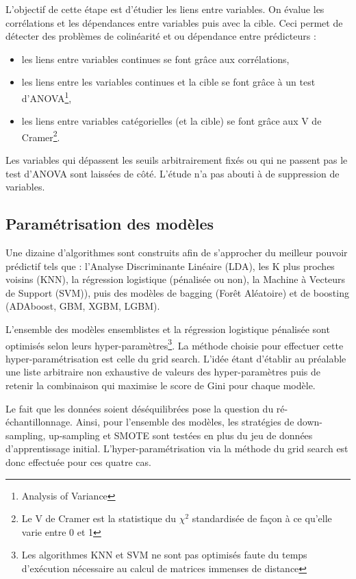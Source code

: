 \documentclass[french]{article}
\begin{document}
\begin{multicols}{2}
L'objectif de cette étape est d'étudier les liens entre variables. On évalue les corrélations et les dépendances entre variables puis avec la cible. Ceci permet de détecter des problèmes de colinéarité et ou dépendance entre prédicteurs :

\begin{itemize}
    \item les liens entre variables continues se font grâce aux corrélations,
    \item les liens entre les variables continues et la cible se font grâce à un test d'ANOVA\footnote{Analysis of Variance},
    \item les liens entre variables catégorielles (et la cible) se font grâce aux V de Cramer\footnote{Le V de Cramer est la statistique du $\chi^2$ standardisée de façon à ce qu'elle varie entre 0 et 1}.
\end{itemize}

Les variables qui dépassent les seuils arbitrairement fixés ou qui ne passent pas le test d'ANOVA sont laissées de côté. L'étude n'a pas abouti à de suppression de variables.

\subsection{Paramétrisation des modèles}

Une dizaine d'algorithmes sont construits afin de s'approcher du meilleur pouvoir prédictif tels que : l'Analyse Discriminante Linéaire (LDA), les K plus proches voisins (KNN), la régression logistique (pénalisée ou non), la Machine à Vecteurs de Support (SVM)), puis des modèles de bagging (Forêt Aléatoire) et de boosting (ADAboost, GBM, XGBM, LGBM).

L'ensemble des modèles ensemblistes et la régression logistique pénalisée sont optimisés selon leurs hyper-paramètres\footnote{Les algorithmes KNN et SVM ne sont pas optimisés faute du temps d'exécution nécessaire au calcul de matrices immenses de distance}. La méthode choisie pour effectuer cette hyper-paramétrisation est celle du \og grid search\fg. L'idée étant d'établir au préalable une liste arbitraire non exhaustive de valeurs des hyper-paramètres puis de retenir la combinaison qui maximise le score de Gini pour chaque modèle. 

Le fait que les données soient déséquilibrées pose la question du ré-échantillonnage. Ainsi, pour l'ensemble des modèles, les stratégies de down-sampling, up-sampling et SMOTE sont testées en plus du jeu de données d'apprentissage initial. L'hyper-paramétrisation via la méthode du \og grid search \fg est donc effectuée pour ces quatre cas.




\end{multicols}
\end{document}

